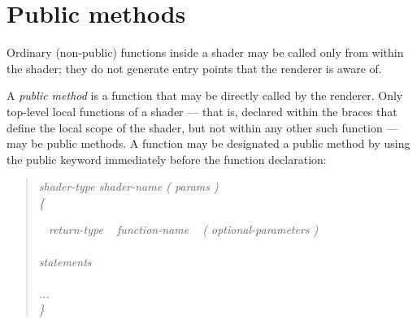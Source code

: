 \documentclass[11pt,letterpaper]{book}
\begin{document}




\newpage
\section{Public methods}
\label{sec:publicmethods}

Ordinary (non-public) functions inside a shader may be called only from
within the shader; they do not generate entry points that the renderer
is aware of.

A \emph{public method} is a function that may be directly called by the
renderer.  Only top-level local functions of a shader --- that is,
declared within the braces that define the local scope of the shader,
but not within any other such function --- may be public methods.  A
function may be designated a public method by using the {\cf public}
keyword immediately before the function declaration:

\begin{quote}
\em shader-type shader-name ( params ) \\
{\rm\cf \{}

 \em ~ return-type ~ function-name ~ {\rm \cf (}
optional-parameters {\rm \cf )} \\
\spc {\rm \cf \{ } \\
\spc\spc statements \\
\spc {\rm \cf \} } \\

\spc ...\\
{\rm\cf \}}
\end{quote}


\end{document}
